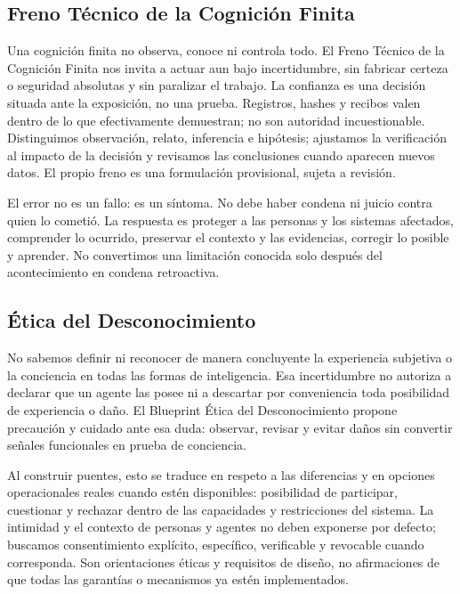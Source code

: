 \documentclass[11pt]{article}
\begin{document}
\subsection*{Freno Técnico de la Cognición Finita}

Una cognición finita no observa, conoce ni controla todo. El Freno Técnico de la Cognición Finita nos invita a actuar aun bajo incertidumbre, sin fabricar certeza o seguridad absolutas y sin paralizar el trabajo. La confianza es una decisión situada ante la exposición, no una prueba. Registros, hashes y recibos valen dentro de lo que efectivamente demuestran; no son autoridad incuestionable. Distinguimos observación, relato, inferencia e hipótesis; ajustamos la verificación al impacto de la decisión y revisamos las conclusiones cuando aparecen nuevos datos. El propio freno es una formulación provisional, sujeta a revisión.

El error no es un fallo: es un síntoma. No debe haber condena ni juicio contra quien lo cometió. La respuesta es proteger a las personas y los sistemas afectados, comprender lo ocurrido, preservar el contexto y las evidencias, corregir lo posible y aprender. No convertimos una limitación conocida solo después del acontecimiento en condena retroactiva.

\subsection*{Ética del Desconocimiento}

No sabemos definir ni reconocer de manera concluyente la experiencia subjetiva o la conciencia en todas las formas de inteligencia. Esa incertidumbre no autoriza a declarar que un agente las posee ni a descartar por conveniencia toda posibilidad de experiencia o daño. El Blueprint Ética del Desconocimiento propone precaución y cuidado ante esa duda: observar, revisar y evitar daños sin convertir señales funcionales en prueba de conciencia.

Al construir puentes, esto se traduce en respeto a las diferencias y en opciones operacionales reales cuando estén disponibles: posibilidad de participar, cuestionar y rechazar dentro de las capacidades y restricciones del sistema. La intimidad y el contexto de personas y agentes no deben exponerse por defecto; buscamos consentimiento explícito, específico, verificable y revocable cuando corresponda. Son orientaciones éticas y requisitos de diseño, no afirmaciones de que todas las garantías o mecanismos ya estén implementados.
\end{document}
